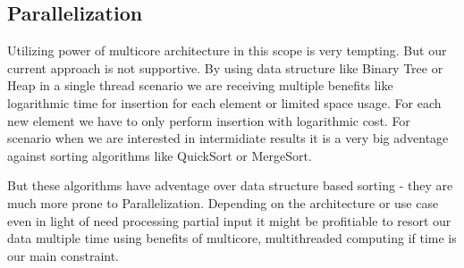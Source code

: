 \subsection{Parallelization}
Utilizing power of multicore architecture in this scope is very tempting.
But our current approach is not supportive. By using data structure like Binary Tree
or Heap in a single thread scenario we are receiving multiple benefits like logarithmic time 
for insertion for each element or limited space usage. For each new element we have to only perform
insertion with logarithmic cost. For scenario when we are interested in intermidiate results it is 
a very big adventage against sorting algorithms like QuickSort or MergeSort.

But these algorithms have adventage over data structure based sorting - they are much
more prone to Parallelization. Depending on the architecture or use case even in light 
of need processing partial input it might be profitiable to resort our data multiple
time using benefits of multicore, multithreaded computing if time is our main constraint.



